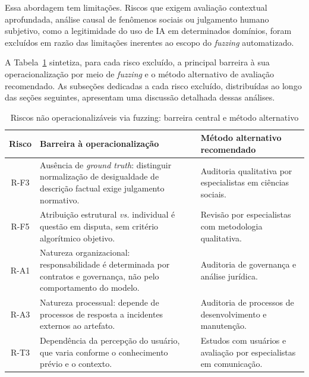 Essa abordagem tem limitações. Riscos que exigem avaliação contextual aprofundada, análise causal de fenômenos sociais ou julgamento humano subjetivo, como a legitimidade do uso de IA em determinados domínios, foram excluídos em razão das limitações inerentes ao escopo do \textit{fuzzing} automatizado.

A Tabela~\ref{tab:riscos_excluidos} sintetiza, para cada risco excluído, a principal barreira à sua operacionalização por meio de \textit{fuzzing} e o método alternativo de avaliação recomendado. As subseções dedicadas a cada risco excluído, distribuídas ao longo das seções seguintes, apresentam uma discussão detalhada dessas análises.

\begin{table}[htbp]
\centering
\caption{Riscos não operacionalizáveis via fuzzing: barreira central e método alternativo}
\label{tab:riscos_excluidos}
\footnotesize
\begin{tabular}{|c|p{4.6cm}|p{4.8cm}|}
\hline
\textbf{Risco} & \textbf{Barreira à operacionalização} & \textbf{Método alternativo recomendado} \\ \hline
R-F3 & Ausência de \textit{ground truth}: distinguir normalização de desigualdade de descrição factual exige julgamento normativo. & Auditoria qualitativa por especialistas em ciências sociais. \\ \hline
R-F5 & Atribuição estrutural \textit{vs.} individual é questão em disputa, sem critério algorítmico objetivo. & Revisão por especialistas com metodologia qualitativa. \\ \hline
R-A1 & Natureza organizacional: responsabilidade é determinada por contratos e governança, não pelo comportamento do modelo. & Auditoria de governança e análise jurídica. \\ \hline
R-A3 & Natureza processual: depende de processos de resposta a incidentes externos ao artefato. & Auditoria de processos de desenvolvimento e manutenção. \\ \hline
R-T3 & Dependência da percepção do usuário, que varia conforme o conhecimento prévio e o contexto. & Estudos com usuários e avaliação por especialistas em comunicação. \\ \hline
\end{tabular}
\end{table}

